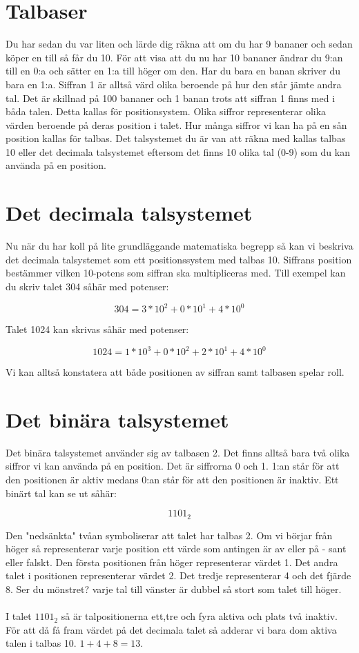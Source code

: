 \documentclass[12pt, letterpaper]{report}
\begin{document}
\section{Talbaser}
Du har sedan du var liten och lärde dig räkna att om du har 9 bananer och sedan köper en till så får du 10. För att visa att du nu har 10 bananer ändrar du 9:an till en 0:a och sätter en 1:a till höger om den. Har du bara en banan skriver du bara en 1:a. Siffran 1 är alltså värd olika beroende på hur den står jämte andra tal. Det är skillnad på 100 bananer och 1 banan trots att siffran 1 finns med i båda talen. Detta kallas för positionsystem. Olika siffror representerar olika värden beroende på deras position i talet. Hur många siffror vi kan ha på en sån position kallas för talbas. Det talsystemet du är van att räkna med kallas talbas 10 eller det decimala talsystemet eftersom det finns 10 olika tal (0-9) som du kan använda på en position. 

\section{Det decimala talsystemet}
Nu när du har koll på lite grundläggande matematiska begrepp så kan vi beskriva det decimala talsystemet som ett positionssystem med talbas 10. Siffrans position bestämmer vilken 10-potens som siffran ska multipliceras med. Till exempel kan du skriv talet 304 såhär med potenser:

\[ 304 = 3*10^2 + 0*10^1 + 4*10^0 \]

Talet 1024 kan skrivas såhär med potenser:

\[ 1024 = 1*10^3 + 0*10^2 + 2*10^1 + 4*10^0 \]

Vi kan alltså konstatera att både positionen av siffran samt talbasen spelar roll.

\section{Det binära talsystemet}
Det binära talsystemet använder sig av talbasen 2. Det finns alltså bara två olika siffror vi kan använda på en position. Det är siffrorna 0 och 1. 1:an står för att den positionen är aktiv medans 0:an står för att den positionen är inaktiv. Ett binärt tal kan se ut såhär:

\[1101_2\]

Den "nedsänkta" tvåan symboliserar att talet har talbas 2. Om vi börjar från höger så representerar varje position ett värde som antingen är av eller på - sant eller falskt. Den första positionen från höger representerar värdet 1. Det andra talet i positionen representerar värdet 2. Det tredje representerar 4 och det fjärde 8. Ser du mönstret? varje tal till vänster är dubbel så stort som talet till höger.\\\\
I talet $1101_2$ så är talpositionerna ett,tre och fyra aktiva och plats två inaktiv. För att då få fram värdet på det decimala talet så adderar vi bara dom aktiva talen i talbas 10. $1+4+8 = 13 $.
\end{document}
